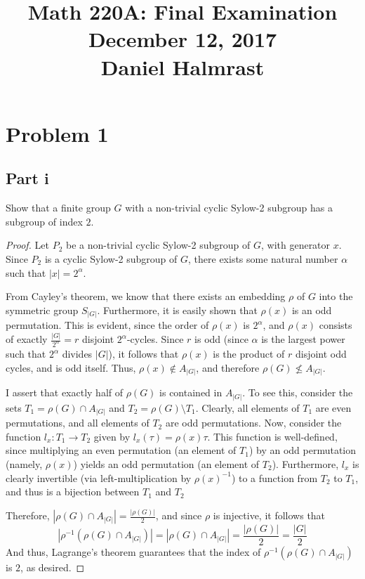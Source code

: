 \documentclass[12pt,reqno]{amsart}
\begin{document}
\title[]{Math 220A: Final Examination\\
        December 12, 2017\\
        Daniel Halmrast}
\maketitle
\large
\section*{Problem 1}
\subsection*{Part i}
Show that a finite group $G$ with a non-trivial cyclic Sylow-2 subgroup has a
subgroup of index $2$.
\\
\begin{proof}
    Let $P_2$ be a non-trivial cyclic Sylow-2 subgroup of $G$, with generator
    $x$. Since $P_2$ is a cyclic Sylow-2 subgroup of $G$, there exists some
    natural number $\alpha$ such that $|x| = 2^{\alpha}$.

    From Cayley's theorem, we know that there exists an embedding $\rho$ of $G$
    into the symmetric group $S_{|G|}$. Furthermore, it is easily shown that
    $\rho(x)$ is an odd permutation. This is evident, since the order of
    $\rho(x)$ is $2^{\alpha}$, and $\rho(x)$ consists of exactly
    $\frac{|G|}{2^{\alpha}} = r$ disjoint $2^{\alpha}$-cycles. Since $r$ is odd (since
    $\alpha$ is the largest power such that $2^{\alpha}$ divides $|G|$), it
    follows that $\rho(x)$ is the product of $r$ disjoint odd cycles, and is
    odd itself. Thus, $\rho(x)\not\in A_{|G|}$,
    and therefore $\rho(G)\not\leq A_{|G|}$.

    I assert that exactly half of $\rho(G)$ is contained in $A_{|G|}$. To see
    this, consider the sets $T_1 = \rho(G)\cap A_{|G|}$ and $T_2 =
    \rho(G)\setminus T_1$. Clearly, all elements of $T_1$ are even permutations, and
    all elements of $T_2$ are odd permutations. Now, consider the function $l_x:T_1\to T_2$
    given by $l_x(\tau) = \rho(x)\tau$. This function is well-defined, since
    multiplying an even permutation (an element of $T_1$) by an odd permutation
    (namely, $\rho(x)$) yields an odd permutation (an element of $T_2$).
    Furthermore, $l_x$ is clearly invertible (via
    left-multiplication by $\rho(x)^{-1}$) to a function from $T_2$ to $T_1$,
    and thus is a bijection between $T_1$ and $T_2$

    Therefore, $|\rho(G)\cap A_{|G|}| = \frac{|\rho(G)|}{2}$, and since $\rho$ is
    injective, it follows that
    \[
    |\rho^{-1}(\rho(G)\cap A_{|G|})| = |\rho(G)\cap A_{|G|}| =
    \frac{|\rho(G)|}{2} = \frac{|G|}{2}
    \]
    And thus, Lagrange's theorem guarantees that the index of
    $\rho^{-1}(\rho(G)\cap A_{|G|})$ is $2$, as desired.
\end{proof}
\end{document}
